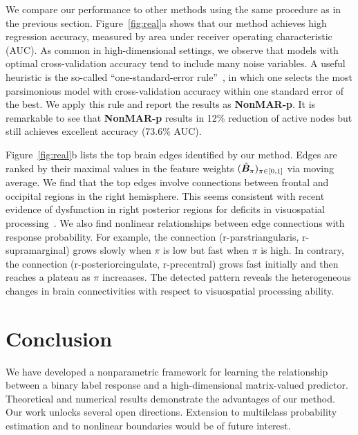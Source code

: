\documentclass[11pt]{article}
\theoremstyle{definition}
\begin{document}
We compare our performance to other methods using the same procedure as in the previous section. Figure~\ref{fig:real}a shows that our method achieves high regression accuracy, measured by area under receiver operating characteristic (AUC). As common in high-dimensional settings, we observe that models with optimal cross-validation accuracy tend to include many noise variables. A useful heuristic is the so-called ``one-standard-error rule''~\citep{hastie2015statistical}, in which one selects the most parsimonious model with cross-validation accuracy within one standard error of the best. We apply this rule and report the results as {\bf \small NonMAR-p}. It is remarkable to see that {\bf \small NonMAR-p} results in 12\% reduction of active nodes but still achieves excellent accuracy (73.6\% AUC). 



Figure~\ref{fig:real}b lists the top brain edges identified by our method. Edges are ranked by their maximal values in the feature weights $(\hat {\bm B}_\pi)_{\pi \in [0,1]}$ via moving average. We find that the top edges involve connections between frontal and occipital regions in the right hemisphere. This seems consistent with recent evidence of dysfunction in right posterior regions for deficits in visuospatial processing~\citep{wang2019common}. We also find nonlinear relationships between edge connections with response probability. For example, the connection (r-parstriangularis, r-supramarginal) grows slowly when $\pi$ is low but fast when $\pi$ is high. In contrary, the connection (r-posteriorcingulate, r-precentral) grows fast initially and then reaches a plateau as $\pi$ increaases. The detected pattern reveals the heterogeneous changes in brain connectivities with respect to visuospatial processing ability. 

\vspace{-.3cm}
\section{Conclusion}
\vspace{-.5cm}
We have developed a nonparametric framework for learning the relationship between a binary label response and a high-dimensional matrix-valued predictor. 
Theoretical and numerical results demonstrate the advantages of our method. Our work unlocks several open directions. Extension to multilclass probability estimation and to nonlinear boundaries would be of future interest. 

\singlespacing



\end{document}
